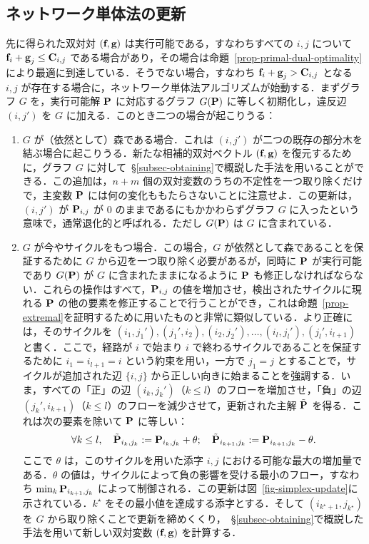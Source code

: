 \subsection{ネットワーク単体法の更新}
先に得られた双対対 $(\fD,\gD)$ は実行可能である，すなわちすべての $i,j$ について $\fD_i+\gD_j\leq \C_{i,j}$ である場合があり，その場合は命題~\ref{prop-primal-dual-optimality}により最適に到達している．そうでない場合，すなわち $\fD_i+\gD_j> \C_{i,j}$ となる $i,j$ が存在する場合に，ネットワーク単体法アルゴリズムが始動する．まずグラフ $G$ を，実行可能解 $\P$ に対応するグラフ $G(\P)$ に等しく初期化し，違反辺 $(i,j')$ を $G$ に加える．このとき二つの場合が起こりうる：
\begin{enumerate}[label={(\alph*)}]
	\item $G$ が（依然として）森である場合．これは $(i,j')$ が二つの既存の部分木を結ぶ場合に起こりうる．新たな相補的双対ベクトル $(\fD,\gD)$ を復元するために，グラフ $G$ に対して~\S\ref{subsec-obtaining}で概説した手法を用いることができる．この追加は，$n+m$ 個の双対変数のうちの不定性を一つ取り除くだけで，主変数 $\P$ には何の変化ももたらさないことに注意せよ．この更新は，$(i,j')$ が $\P_{i,j}$ が $0$ のままであるにもかかわらずグラフ $G$ に入ったという意味で，通常退化的と呼ばれる．ただし $G(\P)$ は $G$ に含まれている．

	\item $G$ が今やサイクルをもつ場合．この場合，$G$ が依然として森であることを保証するために $G$ から辺を一つ取り除く必要があるが，同時に $\P$ が実行可能であり $G(\P)$ が $G$ に含まれたままになるように $\P$ も修正しなければならない．これらの操作はすべて，$\P_{i,j}$ の値を増加させ，検出されたサイクルに現れる $\P$ の他の要素を修正することで行うことができ，これは命題~\ref{prop-extremal}を証明するために用いたものと非常に類似している．より正確には，そのサイクルを $(i_1,j_1'), (j_1',i_2), (i_2,j_2'),\dots, (i_l,j_l'),(j_l',i_{l+1})$ と書く．ここで，経路が $i$ で始まり $i$ で終わるサイクルであることを保証するために $i_1=i_{l+1}=i$ という約束を用い，一方で $j_1=j$ とすることで，サイクルが追加された辺 $\{i,j\}$ から正しい向きに始まることを強調する．いま，すべての「正」の辺 $(i_k,j_k')$（$k\leq l$）のフローを増加させ，「負」の辺 $(j_k',i_{k+1})$（$k\leq l$）のフローを減少させて，更新された主解 $\tilde{\P}$ を得る．これは次の要素を除いて $\P$ に等しい：
$$\forall k\leq l,\quad \tilde{\P}_{i_k,j_k}:= \P_{i_k,j_k}+\theta;\quad \tilde{\P}_{i_{k+1},j_k}:= \P_{i_{k+1},j_k}-\theta.$$
ここで $\theta$ は，このサイクルを用いた添字 $i,j$ における可能な最大の増加量である．$\theta$ の値は，サイクルによって負の影響を受ける最小のフロー，すなわち $\min_{k} \P_{i_{k+1},j_k}$ によって制御される．この更新は図~\ref{fig-simplex-update}に示されている．$k^\star$ をその最小値を達成する添字とする．そして $(i_{k^\star+1},j_{k^\star})$ を $G$ から取り除くことで更新を締めくくり，~\S\ref{subsec-obtaining}で概説した手法を用いて新しい双対変数 $(\fD,\gD)$ を計算する．
\end{enumerate}

